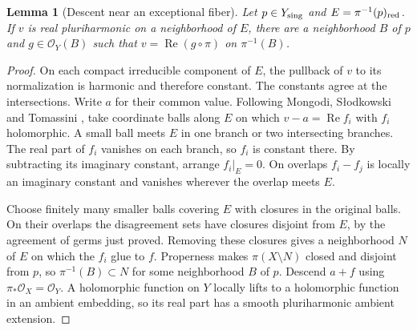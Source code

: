 \documentclass[11pt]{amsart}
\newtheorem{lemma}[theorem]{Lemma}
\theoremstyle{remark}
\numberwithin{equation}{section}
\begin{document}
\begin{lemma}[Descent near an exceptional fiber]\label{lem:descent}
Let \(p\in Y_{\rm sing}\) and \(E=\pi^{-1}(p)_{\rm red}\). If \(v\)
is real pluriharmonic on a neighborhood of \(E\), there are a
neighborhood \(B\) of \(p\) and \(g\in\mathcal O_Y(B)\) such that
\(v=\operatorname{Re}(g\circ\pi)\) on \(\pi^{-1}(B)\).
\end{lemma}
\begin{proof}
On each compact irreducible component of \(E\), the pullback of \(v\)
to its normalization is harmonic and therefore constant. The constants
agree at the intersections. Write \(a\) for their common value.
Following Mongodi, S{\l}odkowski and Tomassini
\cite[proof of Lemma~4.1]{MST}, take coordinate balls along \(E\)
on which \(v-a=\operatorname{Re}f_i\) with \(f_i\) holomorphic.
A small ball meets \(E\) in one branch or two intersecting branches.
The real part of \(f_i\) vanishes on each branch, so \(f_i\) is
constant there. By subtracting its imaginary constant, arrange
\(f_i|_E=0\). On overlaps \(f_i-f_j\) is locally an imaginary constant
and vanishes wherever the overlap meets \(E\).

Choose finitely many smaller balls covering \(E\) with closures in the
original balls. On their overlaps the disagreement sets have closures
disjoint from \(E\), by the agreement of germs just proved.
Removing these closures gives a neighborhood \(N\) of \(E\) on which
the \(f_i\) glue to \(f\). Properness makes \(\pi(X\setminus N)\)
closed and disjoint from \(p\), so \(\pi^{-1}(B)\subset N\) for some
neighborhood \(B\) of \(p\). Descend \(a+f\) using
\(\pi_*\mathcal O_X=\mathcal O_Y\). A holomorphic function on \(Y\)
locally lifts to a holomorphic function in an ambient embedding, so its
real part has a smooth pluriharmonic ambient extension.
\end{proof}
\end{document}
